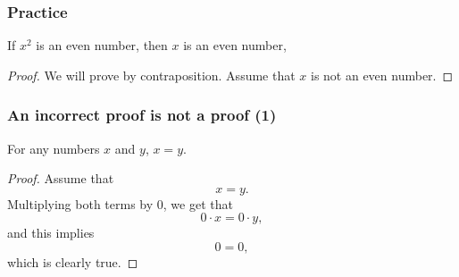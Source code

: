 \begin{frame}\frametitle{Practice}
  \begin{theorem}
    If $x^2$ is an even number, then $x$ is an even number, 
  \end{theorem} \pause
  \begin{proof}
    We will prove by contraposition.  
    Assume that $x$ is not an even number.

    \vspace{1.5in}
  \end{proof}
\end{frame}

\begin{frame}\frametitle{An incorrect proof is not a proof (1)}
  \begin{theorem}
    For any numbers $x$ and $y$, $x = y$.
  \end{theorem}
  \pause

  \begin{proof}
    Assume that
    \[ x = y. \] \pause
    Multiplying both terms by 0, we get that
    \[ 0\cdot x = 0\cdot y, \] \pause
    and this implies
    \[ 0 = 0, \]
    which is clearly true.
  \end{proof}
\end{frame}
